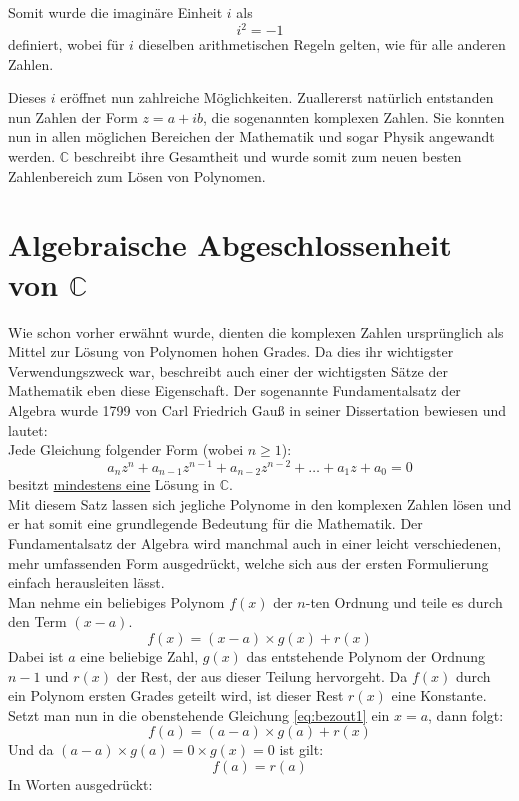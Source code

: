 \documentclass[a4paper,12pt]{article} %
\begin{document}
Somit wurde die imaginäre Einheit $i$ als
\[i^2=-1\]
definiert, wobei für $i$ dieselben arithmetischen Regeln gelten, wie für alle anderen Zahlen.

Dieses $i$ eröffnet nun zahlreiche Möglichkeiten.
Zuallererst natürlich entstanden nun Zahlen der Form $z=a+ib$, die sogenannten komplexen Zahlen.
Sie konnten nun in allen möglichen Bereichen der Mathematik und sogar Physik angewandt werden.
$\mathbb{C}$ beschreibt ihre Gesamtheit und wurde somit zum neuen besten Zahlenbereich zum Lösen von Polynomen.


\section{Algebraische Abgeschlossenheit von $\mathbb{C}$}

Wie schon vorher erwähnt wurde, dienten die komplexen Zahlen ursprünglich als Mittel zur Lösung von Polynomen hohen Grades.
Da dies ihr wichtigster Verwendungszweck war, beschreibt auch einer der wichtigsten Sätze der Mathematik eben diese Eigenschaft.
Der sogenannte Fundamentalsatz der Algebra wurde 1799 von Carl Friedrich Gauß in seiner Dissertation bewiesen und lautet:\\


\noindent Jede Gleichung folgender Form (wobei $n \geq 1 $):
\begin{equation}\label{eq:funda}
\boxed{
a_nz^n + a_{n-1}z^{n-1} + a_{n-2}z^{n-2} + \dots + a_1z + a_0 = 0
}
\end{equation} 
besitzt \underline{mindestens eine} Lösung in $\mathbb{C}$.\\



Mit diesem Satz lassen sich jegliche Polynome in den komplexen Zahlen lösen und er hat somit eine grundlegende Bedeutung für die Mathematik.
Der Fundamentalsatz der Algebra wird manchmal auch in einer leicht verschiedenen, mehr umfassenden Form ausgedrückt, welche sich aus der ersten Formulierung einfach herausleiten lässt.\\

\noindent Man nehme ein beliebiges Polynom $f(x)$ der $n$-ten Ordnung und teile es durch den Term $(x-a)$.
\begin{equation}\label{eq:bezout1}
f(x) = (x - a) \times g(x) + r(x)
\end{equation} 
Dabei ist $a$ eine beliebige Zahl, $g(x)$ das entstehende Polynom der Ordnung $n-1$ und $r(x)$ der Rest, der aus dieser Teilung hervorgeht.
Da $f(x)$ durch ein Polynom ersten Grades geteilt wird, ist dieser Rest $r(x)$ eine Konstante.
Setzt man nun in die obenstehende Gleichung \eqref{eq:bezout1} ein $x=a$, dann folgt:
\[ f(a) = (a-a) \times g(a) + r(x) \]
Und da $(a - a) \times g(a) = 0 \times g(x) = 0 $ ist gilt:
\[ f(a) = r(a) \]
In Worten ausgedrückt:
\end{document}
